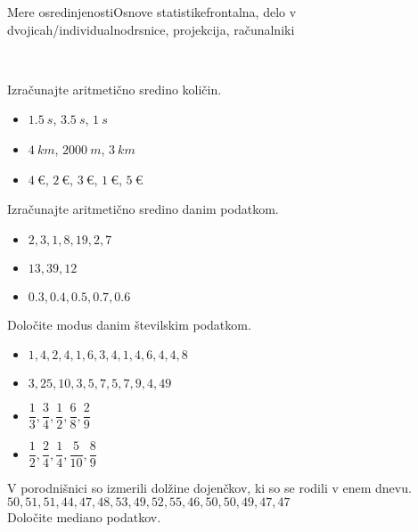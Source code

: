 \begin{priprava}{3}{}{Mere osredinjenosti}{Osnove statistike}{frontalna, delo v dvojicah/individualno}{drsnice, projekcija, računalniki}
\begin{figure}[H]
        \end{figure}
    

        ~




    \begin{naloga}
        Izračunajte aritmetično sredino količin.
        \begin{itemize}
            \item $1.5~s$, $3.5~s$, $1~s$
            \item $4~km$, $2000~m$, $3~km$
            \item $4~€$, $2~€$, $3~€$, $1~€$, $5~€$
        \end{itemize}
    \end{naloga}

    \begin{naloga}
        Izračunajte aritmetično sredino danim podatkom.
        \begin{itemize}
            \item $2, 3, 1, 8, 19, 2, 7$
            \item $13, 39, 12$
            \item $0.3, 0.4, 0.5, 0.7, 0.6$
        \end{itemize}            \end{naloga}



    \begin{naloga}
        Določite modus danim številskim podatkom.
        \begin{itemize}
            \item $1, 4, 2, 4, 1, 6, 3, 4, 1, 4, 6, 4, 4, 8$
            \item $3, 25, 10, 3, 5, 7, 5, 7, 9, 4, 49$
            \item $\dfrac{1}{3}, \dfrac{3}{4}, \dfrac{1}{2}, \dfrac{6}{8}, \dfrac{2}{9}$
            \item $\dfrac{1}{2}, \dfrac{2}{4}, \dfrac{1}{4}, \dfrac{5}{10}, \dfrac{8}{9}$
        \end{itemize}
    \end{naloga}

    \begin{naloga}
        V porodnišnici so izmerili dolžine dojenčkov, ki so se rodili v enem dnevu.  \\
        $50, 51, 51, 44, 47, 48, 53, 49, 52, 55, 46, 50, 50, 49, 47, 47$ \\
        Določite mediano podatkov.
    \end{naloga}






\end{priprava}
